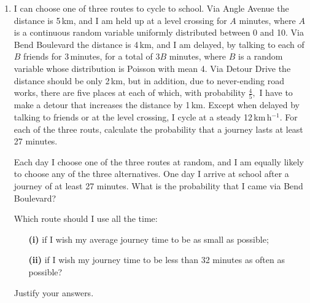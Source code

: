\documentclass[a4, 11pt]{report}
\newlength{\qspace}
\newcounter{qnumber}
\newenvironment{question}%
 {\vspace{\qspace}
  \begin{enumerate}[\bfseries 1\quad][10]%
    \setcounter{enumi}{\value{qnumber}}%
    \item%
 }
{
  \end{enumerate}
  \filbreak
  \stepcounter{qnumber}
 }
\begin{document}
\begin{question}
I can choose one of three routes to cycle to school. Via Angle Avenue
the distance is 5$\,$km, and I am held up at a level crossing for
$A$ minutes, where $A$ is a continuous random variable uniformly
distributed between $0$ and 10. Via Bend Boulevard the distance is
4$\,$km, and I am delayed, by talking to each of $B$ friends for
3$\,$minutes, for a total of $3B$ minutes, where $B$ is a random
variable whose distribution is Poisson with mean 4. Via Detour Drive
the distance should be only 2$\,$km, but in addition, due to never-ending
road works, there are five places at each of which, with probability
$\frac{4}{5},$ I have to make a detour that increases the distance
by 1$\,$km. Except when delayed by talking to friends or at the level
crossing, I cycle at a steady 12$\,$km$\,$h$^{-1}$. For each of
the three routs, calculate the probability that a journey lasts at
least 27 minutes. 


Each day I choose one of the three routes at random, and I am equally
likely to choose any of the three alternatives. One day I arrive at
school after a journey of at least 27 minutes. What is the probability
that I came via Bend Boulevard?


Which route should I use all the time: 
\begin{itemize}
\setlength{\itemsep}{3mm}
\item[\bf (i)] if I wish my average journey time to be as small as possible; 
\item[\bf (ii)] if I wish my journey time to be less than 32 minutes as often as possible?
\end{itemize}

Justify your answers. 
\end{question}
\end{document}
